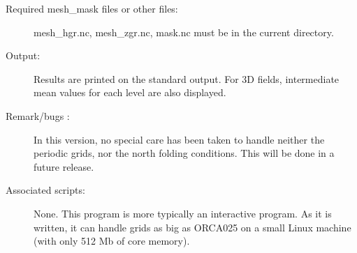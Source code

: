 \documentclass[a4paper,11pt]{article}
\begin{document}
\begin{description}
\item[Required mesh\_mask files or other files:]   mesh\_hgr.nc, mesh\_zgr.nc, mask.nc must be in the current directory.
\item[Output:] Results are printed  on the standard output. For 3D fields, intermediate mean values for each level are also
displayed.
\item[Remark/bugs :] In this version, no special care has been taken to handle neither the periodic grids, nor the north folding conditions.
This will be done in a future release.
\item[Associated scripts:] {None. This program is more typically an interactive program. As it is written, it can handle grids as big
as ORCA025 on a small Linux machine (with only 512 Mb of core memory).}
\end{description}

\newpage
\end{document}
